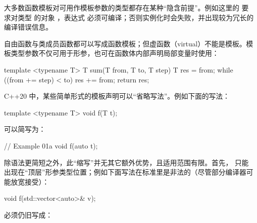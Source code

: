 大多数函数模板对可用作模板参数的类型都存在某种“隐含前提”。例如这里的  要求对类型  的对象 ，表达式  必须可编译；否则实例化时会失败，并出现较为冗长的编译错误信息。

自由函数与类成员函数都可以写成函数模板；但虚函数（virtual）不能是模板。模板类型参数不仅可用于形参，也可在函数体内部声明局部变量时使用：

\begin{code}
template <typename T> T sum(T from, T to, T step) {
  T res = from;
  while ((from += step) < to) { res += from; }
  return res;
}
\end{code}

C++20 中，某些简单形式的模板声明可以“省略写法”。例如下面的写法：

\begin{code}
template <typename T> void f(T t);
\end{code}

可以简写为：

\begin{code}
// Example 01a
void f(auto t);
\end{code}

除语法更简短之外，此“缩写”并无其它额外优势，且适用范围有限。首先， 只能出现在“顶层”形参类型位置；例如下面写法在标准里是非法的（尽管部分编译器可能放宽接受）：

\begin{code}
void f(std::vector<auto>& v);
\end{code}

必须仍旧写成：

